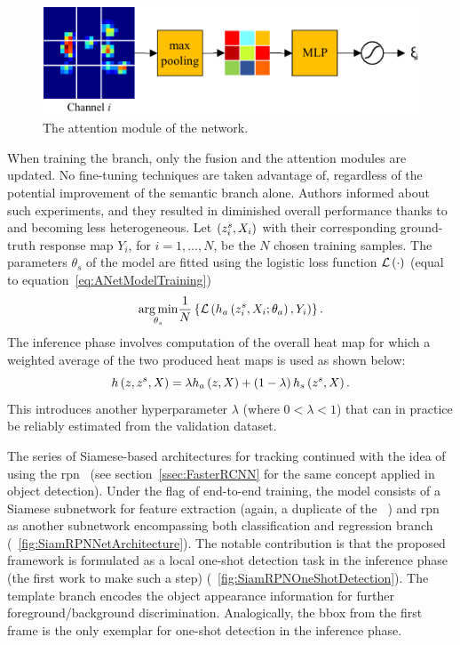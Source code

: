 \begin{figure}[t]
    \centerline{\includegraphics[width=0.6\linewidth]{figures/theoretical_foundations/twofold_siamese_net_attention_module.pdf}}
    \caption[ attention module]{The attention module of the  network. }
    \label{fig:TwofoldSiameseNetAttentionModule}
\end{figure}

When training the  branch, only the fusion and the attention modules are updated. No fine-tuning techniques are taken advantage of, regardless of the potential improvement of the semantic branch alone. Authors informed about such experiments, and they resulted in diminished overall performance thanks to  and  becoming less heterogeneous. Let $\left( {{z}_{i}^{s}, X_i} \right)$ with their corresponding ground-truth response map $Y_i$, for $i = 1, \dots, N$, be the $N$ chosen training samples. The parameters $\theta_s$ of the  model are fitted using the logistic loss function ${\mathcal{L}} \left( \cdot \right)$ (equal to equation~\ref{eq:ANetModelTraining})
\begin{equation}
    \label{eq:SNetModelTraining}
    \underset{\theta_s}{\operatorname*{arg\,min}}
    \frac{1}{N}
    \left\{ {
        {\mathcal{L}} \left( 
            {h_a} \left( {z}_{i}^{s}, X_i; \theta_a \right),
            Y_i
         \right)
    } \right\}.
\end{equation}
The inference phase involves computation of the overall heat map for which a weighted average of the two produced heat maps is used as shown below:
\begin{equation}
    {h} \left( z, z^s, X \right) = \lambda {h_a} \left( z, X \right) + \left( {1 - \lambda} \right) {h_s} \left( z^s, X \right).
\end{equation}
This introduces another hyperparameter $\lambda$ (where $0 < \lambda < 1$) that can in practice be reliably estimated from the validation dataset.

The series of Siamese-based architectures for tracking continued with the idea of using the \gls{rpn}~\cite{li2018siamrpn} (see section~\ref{ssec:FasterRCNN} for the same concept applied in object detection). Under the flag of end-to-end training, the  model consists of a Siamese subnetwork for feature extraction (again, a duplicate of the ~\cite{bertinetto2016siamfc}) and \gls{rpn} as another subnetwork encompassing both classification and regression branch (\figstr{}~\ref{fig:SiamRPNNetArchitecture}). The notable contribution is that the proposed framework is formulated as a local one-shot detection task in the inference phase (the first work to make such a step) (\figstr{}~\ref{fig:SiamRPNOneShotDetection}). The template branch encodes the object appearance information for further foreground/background discrimination. Analogically, the \gls{bbox} from the first frame is the only exemplar for one-shot detection in the inference phase.

